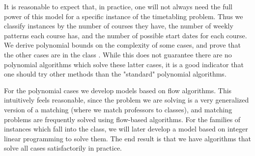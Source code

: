 It is reasonable to expect that, in practice, one will not always need the full power of this model for a specific instance of the timetabling problem. Thus we classify instances by the number of courses they have, the number of weekly patterns each course has, and the number of possible start dates for each course. We derive polynomial bounds on the complexity of some cases, and prove that the other cases are in the class \npc. While this does not guarantee there are no polynomial algorithms which solve these latter cases, it is a good indicator that one should try other methods than the "standard" polynomial algorithms.

For the polynomial cases we develop models based on flow algorithms. This intuitively feels reasonable, since the problem we are solving is a very generalized version of a matching (where we match professors to classes), and matching problems are frequently solved using flow-based algorithms\cite{clrs}. For the families of instances which fall into the \npc class, we will later develop a model based on integer linear programming to solve them. The end result is that we have algorithms that solve all cases satisfactorily in practice.
